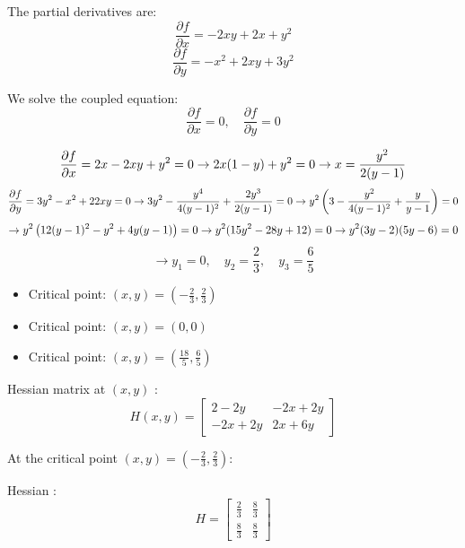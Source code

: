 \documentclass{article} %
\begin{document}
{    The partial derivatives are:
    \[ \frac{\partial f}{\partial x} = - 2 x y + 2 x + y^{2} \]
    \[ \frac{\partial f}{\partial y} = - x^{2} + 2 x y + 3 y^{2} \]

    We solve the coupled equation:
    \[ \frac{\partial f}{\partial x} = 0, \quad \frac{\partial f}{\partial y} = 0 \]

    \[ \frac{\partial f}{\partial x} = 2x - 2xy + y^2 = 0 \\\\
    \rightarrow 2x(1 - y) + y^2 = 0 \\\\
    \rightarrow x = \frac{y^2}{2(y - 1)} \]
    \[ \frac{\partial f}{\partial y} = 3y^2 - x^2 + 22xy = 0 \\\\
    \rightarrow 3y^2 - \frac{y^4}{4(y - 1)^2} + \frac{2y^3}{2(y - 1)} = 0 \\\\[10pt]
    \rightarrow y^2 \left(3 - \frac{y^2}{4(y - 1)^2} + \frac{y}{y - 1} \right) = 0 \\\\\]
    \[ \rightarrow y^2 \left(12(y - 1)^2 - y^2 + 4y(y - 1) \right) = 0 \\\\[10pt]
    \rightarrow y^2 (15y^2 - 28y + 12) = 0 \\\\[10pt]
    \rightarrow y^2{(3y - 2)(5y - 6)} = 0 \\\]
    \[ \rightarrow y_1 = 0, \quad y_2 = \frac{2}{3}, \quad y_3 = \frac{6}{5} \]

    \begin{itemize}
    \item Critical point: $(x, y) = (- \frac{2}{3}, \frac{2}{3})$
    \item Critical point: $(x, y) = (0, 0)$
    \item Critical point: $(x, y) = (\frac{18}{5}, \frac{6}{5})$
    \end{itemize}

    Hessian matrix at $(x, y)$ : \[ H(x, y) = \begin{bmatrix}
        2 - 2y & -2x + 2y \\
        -2x + 2y & 2x + 6y
    \end{bmatrix} \]

    At the critical point $(x, y) = (- \frac{2}{3}, \frac{2}{3})$:

    Hessian :
    \[
    H = \left[\begin{matrix}\frac{2}{3} & \frac{8}{3}\\\frac{8}{3} & \frac{8}{3}\end{matrix}\right]
    \]

}
\end{document}
